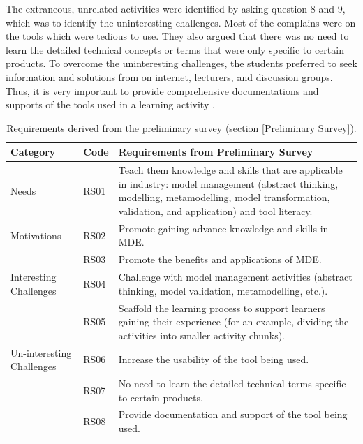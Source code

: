 \documentclass[12pt, a4paper]{report}
\begin{document}
The extraneous, unrelated activities were identified by asking question 8 and 9, which was to identify the uninteresting challenges. Most of the complains were on the tools which were tedious to use. They also argued that there was no need to learn the detailed technical concepts or terms that were only specific to certain products. To overcome the uninteresting challenges, the students preferred to seek information and solutions from on internet, lecturers, and discussion groups. Thus, it is very important to provide comprehensive documentations and supports of the tools used in a learning activity  \cite{liebel2015ready}. 

\begin{table}[ht]
\caption{Requirements derived from the preliminary survey (section \ref{Preliminary Survey}).}
\label{table:preliminary-survey}
\begin{center}
\begin{tabular}{ p{2cm}p{1cm}p{10cm} } 
\hline
Category & Code & Requirements from Preliminary Survey \\
\hline
\multirow{1}{2cm}{Needs} 
& RS01 & Teach them knowledge and skills that are applicable in industry: model management (abstract thinking, modelling, metamodelling, model transformation, validation, and application) and tool literacy. \\ 
\hline
\multirow{1}{2cm}{Motivations}
& RS02 & Promote gaining advance knowledge and skills in MDE. \\ 
& RS03 & Promote the benefits and applications of MDE. \\ 
\hline
\multirow{1}{2cm}{Interesting Challenges}
& RS04 & Challenge with model management activities (abstract thinking, model validation, metamodelling, etc.). \\ 
& RS05 & Scaffold the learning process to support learners gaining their experience (for an example, dividing the activities into smaller activity chunks). \\ 
\hline
\multirow{1}{2cm}{Un-interesting Challenges}
& RS06 & Increase the usability of the tool being used. \\ 
& RS07 & No need to learn the detailed technical terms specific to certain products. \\ 
& RS08 & Provide documentation and support of the tool being used. \\ 
\hline
\end{tabular}
\end{center}
\end{table}
\end{document}
